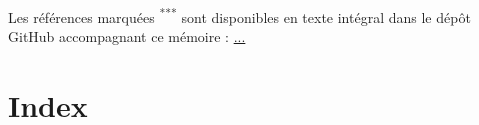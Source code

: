\documentclass[12pt,a4paper]{report}
\begin{document}

\cleardoublepage
{}

\printglossary


\cleardoublepage
\printbibheading[heading=bibintoc,title={Bibliographie}]

\small

\noindent Les références marquées \textsuperscript{***}
sont disponibles en texte intégral dans le dépôt GitHub
accompagnant ce mémoire :
\href{...}{...}

\vspace{0.8em}

\nocite{*}
\printbibliography[heading=none]

\cleardoublepage
\chapter*{Index}

\printindex[nom]
\newpage
\printindex[tab]
\newpage
\printindex[carte]
\end{document}
